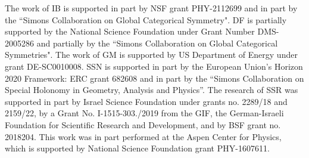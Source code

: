 \documentclass[12pt]{article}
\begin{document}
The work of IB is supported
in part by NSF grant PHY-2112699 and in part by the ``Simons Collaboration on Global Categorical Symmetry".
DF is partially supported by the
National Science Foundation under Grant Number DMS-2005286 and partially by the ``Simons Collaboration on Global Categorical Symmetries".
The work of GM is supported by US Department of Energy under grant DE-SC0010008.
SSN is supported in part by the European Union's Horizon 2020 Framework: 
ERC grant 682608 and in part by the ``Simons Collaboration on Special Holonomy in Geometry, Analysis and Physics''. The research of SSR was supported in part by Israel Science Foundation under grants no. 2289/18 and 2159/22, by a Grant No. I-1515-303./2019 from the GIF, the German-Israeli Foundation for Scientific Research and Development, and by BSF grant no. 2018204. This work was in part performed at the Aspen Center for Physics, which is supported by National Science Foundation grant PHY-1607611.




 



\end{document}
